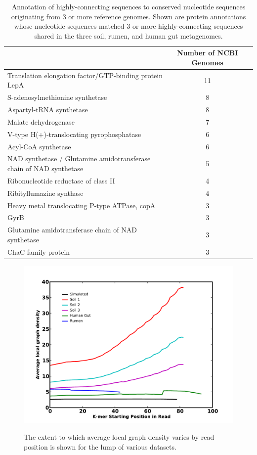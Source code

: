 \documentclass[10pt]{article}
\begin{document}
\begin{table}
\caption{Annotation of highly-connecting sequences to conserved nucleotide sequences originating from 3 or more reference genomes.  Shown are protein annotations whose nucleotide sequences matched 3 or more highly-connecting sequences shared in the three soil, rumen, and human gut metagenomes.}
\begin{tabular}{lc c}
\hline
& Number of NCBI Genomes \\
\hline
Translation elongation factor/GTP-binding protein LepA	&11\\
S-adenosylmethionine synthetase	&8\\
Aspartyl-tRNA synthetase	 &8\\
Malate dehydrogenase	&7\\
V-type H(+)-translocating pyrophosphatase	&6\\
Acyl-CoA synthetase	&6\\
NAD synthetase / Glutamine amidotransferase chain of NAD synthetase	&5\\
Ribonucleotide reductase of class II	&4\\
Ribityllumazine synthase	&4\\
Heavy metal translocating P-type ATPase, copA	&3\\
GyrB	 &3\\
Glutamine amidotransferase chain of NAD synthetase	&3\\
ChaC family protein	&3\\
\end{tabular}
\end{table}

\begin{figure}
\center
{\includegraphics[width=5in]{./figures/figure1-density.pdf}}
\caption{The extent to which average local graph density varies by read position is shown for the lump of various datasets.}
\end{figure}
\end{document}
